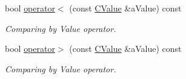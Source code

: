 \begin{DoxyCompactItemize}
bool \hyperlink{class_c_value___t_student_1_1_c_value_a616db0b5d1db68fef3d0cdfb382e37c4}{operator$<$} (const \hyperlink{class_c_value___t_student_1_1_c_value}{C\+Value} \&a\+Value) const
\begin{DoxyCompactList}\small\item\em Comparing by Value operator. \end{DoxyCompactList}\item 
bool \hyperlink{class_c_value___t_student_1_1_c_value_a5388821b6aef1ce4a0e5411145af9d72}{operator$>$} (const \hyperlink{class_c_value___t_student_1_1_c_value}{C\+Value} \&a\+Value) const
\begin{DoxyCompactList}\small\item\em Comparing by Value operator. \end{DoxyCompactList}\end{DoxyCompactItemize}
